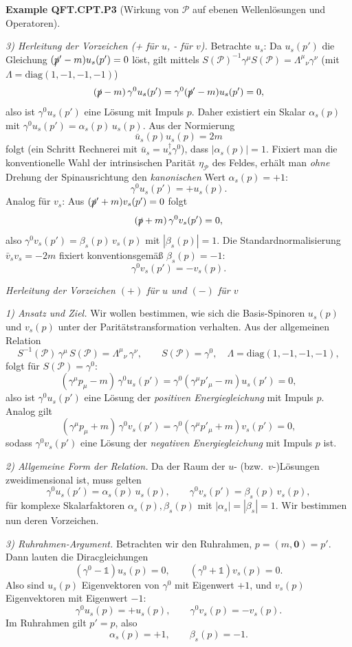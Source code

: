 \documentclass[10pt, letterpaper]{article}
\newcommand{\CustomHeading}[3]{%
  \par\medskip\noindent%
  \textbf{#1 #2} \textnormal{(#3)}.\enskip%
}
\newenvironment{EXA}[2]{\begin{unitbox}\CustomHeading{Example}{#1}{#2}}{\end{unitbox}}
\begin{document}
\begin{EXA}{QFT.CPT.P3}{Wirkung von $\mathcal P$ auf ebenen Wellenlösungen und Operatoren}
\emph{3) Herleitung der Vorzeichen (+ für $u$, - für $v$).}
Betrachte $u_s$: Da $u_s(p')$ die Gleichung $(\slashed p'-m)u_s(p')=0$ löst, gilt mittels $S(\mathcal P)^{-1}\gamma^\mu S(\mathcal P)=\Lambda^\mu{}_\nu\gamma^\nu$ (mit $\Lambda=\mathrm{diag}(1,-1,-1,-1)$)
\[
(\slashed p - m)\,\gamma^0 u_s(p')=\gamma^0(\slashed p'-m)u_s(p')=0,
\]
also ist $\gamma^0 u_s(p')$ eine Lösung mit Impuls $p$. Daher existiert ein Skalar $\alpha_s(p)$ mit $\gamma^0 u_s(p')=\alpha_s(p)\,u_s(p)$. Aus der Normierung
\[
\bar u_s(p)u_s(p)=2m
\]
folgt (ein Schritt Rechnerei mit $\bar u_s=\!u_s^\dagger\gamma^0$), dass $|\alpha_s(p)|=1$. Fixiert man die konventionelle Wahl der intrinsischen Parität $\eta_{\mathcal P}$ des Feldes, erhält man \emph{ohne} Drehung der Spinausrichtung den \emph{kanonischen} Wert $\alpha_s(p)=+1$:
\[
\gamma^0 u_s(p')=+u_s(p).
\]
Analog für $v_s$: Aus $(\slashed p'+m)v_s(p')=0$ folgt
\[
(\slashed p+m)\,\gamma^0 v_s(p')=0,
\]
also $\gamma^0 v_s(p')=\beta_s(p)\,v_s(p)$ mit $|\beta_s(p)|=1$. Die Standardnormalisierung $\bar v_s v_s=-2m$ fixiert konventionsgemäß $\beta_s(p)=-1$:
\[
\gamma^0 v_s(p')=-v_s(p).
\]

\emph{Herleitung der Vorzeichen $\boldsymbol{(+)}$ für $u$ und $\boldsymbol{(-)}$ für $v$}

\emph{1) Ansatz und Ziel.}
Wir wollen bestimmen, wie sich die Basis-Spinoren $u_s(p)$ und $v_s(p)$ unter der Paritätstransformation verhalten.  
Aus der allgemeinen Relation
\[
S^{-1}(\mathcal P)\,\gamma^\mu\,S(\mathcal P)
= \Lambda^\mu{}_\nu\,\gamma^\nu,
\qquad
S(\mathcal P)=\gamma^0,\quad
\Lambda=\mathrm{diag}(1,-1,-1,-1),
\]
folgt für $S(\mathcal P)=\gamma^0$:
\[
(\gamma^\mu p_\mu - m)\,\gamma^0 u_s(p')
= \gamma^0(\gamma^\mu p'_\mu - m)u_s(p') = 0,
\]
also ist $\gamma^0 u_s(p')$ eine Lösung der \emph{positiven Energiegleichung} mit Impuls $p$.  
Analog gilt
\[
(\gamma^\mu p_\mu + m)\,\gamma^0 v_s(p')
= \gamma^0(\gamma^\mu p'_\mu + m)v_s(p') = 0,
\]
sodass $\gamma^0 v_s(p')$ eine Lösung der \emph{negativen Energiegleichung} mit Impuls $p$ ist.

\emph{2) Allgemeine Form der Relation.}
Da der Raum der $u$- (bzw.\ $v$-)Lösungen zweidimensional ist, muss gelten
\[
\gamma^0 u_s(p') = \alpha_s(p)\,u_s(p),\qquad
\gamma^0 v_s(p') = \beta_s(p)\,v_s(p),
\]
für komplexe Skalarfaktoren $\alpha_s(p),\beta_s(p)$ mit $|\alpha_s|=|\beta_s|=1$.  
Wir bestimmen nun deren Vorzeichen.

\emph{3) Ruhrahmen-Argument.}
Betrachten wir den Ruhrahmen, $p=(m,\mathbf 0)=p'$.  
Dann lauten die Diracgleichungen
\[
(\gamma^0 - \mathbb 1)u_s(p)=0, \qquad (\gamma^0 + \mathbb 1)v_s(p)=0.
\]
Also sind $u_s(p)$ Eigenvektoren von $\gamma^0$ mit Eigenwert $+1$, und $v_s(p)$ Eigenvektoren mit Eigenwert $-1$:
\[
\gamma^0 u_s(p)=+u_s(p),\qquad \gamma^0 v_s(p)=-v_s(p).
\]
Im Ruhrahmen gilt $p'=p$, also
\[
\alpha_s(p)=+1,\qquad \beta_s(p)=-1.
\]


\end{EXA}
\end{document}
